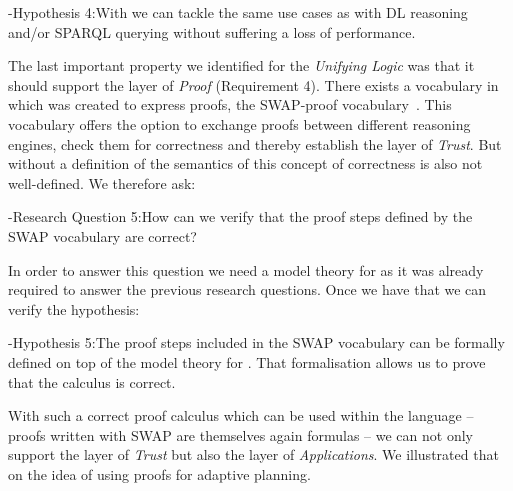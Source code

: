\hyp{Hypothesis 4:}{With \nthreelogic %
we can tackle the same use cases as with \owl DL reasoning and/or SPARQL querying without suffering a loss of performance.
% 
}


The last important property we identified for the \emph{Unifying Logic} was that it should support the layer of \emph{Proof} (Requirement 4).
There exists a vocabulary in \nthree which was created to express proofs, the SWAP-proof vocabulary~\cite{Proof}. %
This vocabulary offers the option to exchange proofs between different reasoning engines, check them for correctness and thereby establish the layer of \emph{Trust}.
But without a definition of the semantics of \nthree this concept of correctness is also not well-defined. 
We therefore ask:


\hyp{Research Question 5:}{How can we verify that the proof steps defined by the SWAP vocabulary are correct?}

In order to answer this question we need a model theory for \nthree as it was already required to answer the previous research questions. Once we have that we can
verify the hypothesis:

\hyp{Hypothesis 5:}{The proof steps included in the SWAP vocabulary can be formally defined on top of the model theory for \nthree. 
That formalisation allows us to prove that the calculus is correct.} 

With such a correct proof calculus which can be used within the language -- proofs written with SWAP are themselves again \nthree formulas -- we can not only 
support the layer of \emph{Trust} but also the layer of \emph{Applications}. %
We illustrated that on the idea of using \nthree proofs for adaptive planning.
% 
% 

